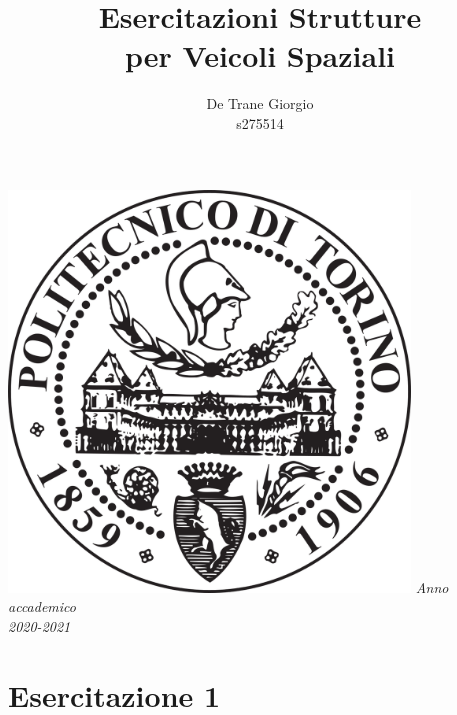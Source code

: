 \documentclass{article}
\author{De Trane Giorgio\\s275514}
\title{\textbf{Esercitazioni Strutture\\per Veicoli Spaziali}}
\begin{document}
    \maketitle
    \begin{center}
        \includegraphics[width=0.8\textwidth]{polito_logo.png}
        \linebreak
        \linebreak
        \textit{Anno accademico\\2020-2021}
    \end{center}
    \pagebreak
    \section{Esercitazione 1}
\end{document}
